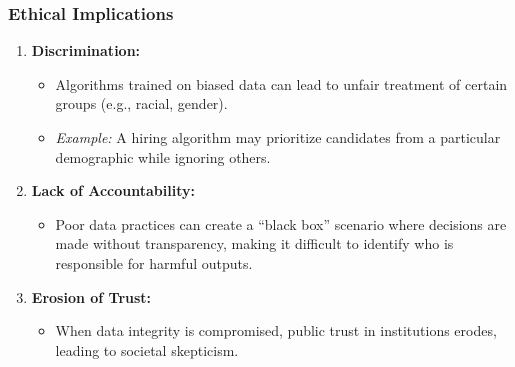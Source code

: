 \documentclass{beamer}
\begin{document}
\begin{frame}[fragile]
    \frametitle{Ethical Implications}
    \begin{enumerate}
        \item \textbf{Discrimination:}
        \begin{itemize}
            \item Algorithms trained on biased data can lead to unfair treatment of certain groups (e.g., racial, gender).
            \item \textit{Example:} A hiring algorithm may prioritize candidates from a particular demographic while ignoring others.
        \end{itemize}

        \item \textbf{Lack of Accountability:}
        \begin{itemize}
            \item Poor data practices can create a “black box” scenario where decisions are made without transparency, making it difficult to identify who is responsible for harmful outputs.
        \end{itemize}

        \item \textbf{Erosion of Trust:}
        \begin{itemize}
            \item When data integrity is compromised, public trust in institutions erodes, leading to societal skepticism.
        \end{itemize}
    \end{enumerate}
\end{frame}
\end{document}

